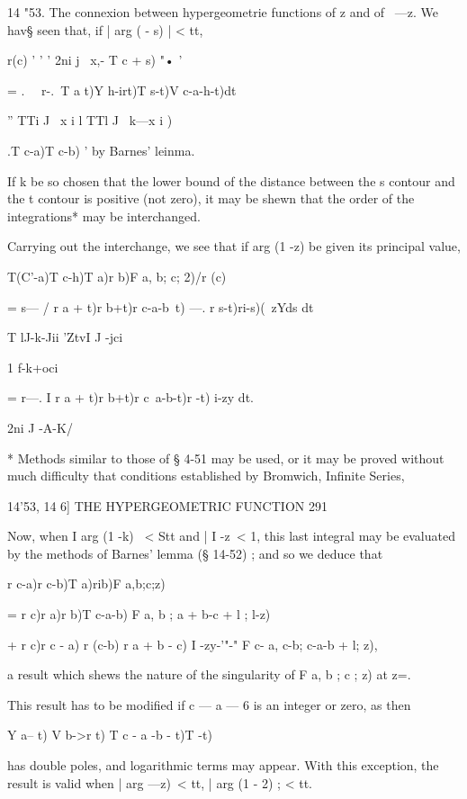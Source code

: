 14 "53. The connexion between hypergeometrie functions of z and of \ —z. 
We hav§ seen that, if | arg ( - s) | < tt, 

r(c)   ' ' '   2ni j \ x,- T c + s) "• ' 

=   . \ \  r-.\ T a t)Y h-irt)T s-t)V c-a-h-t)dt\ 

'' TTi J \ x i l TTl J ~k—x i ) 

.T c-a)T c-b)  ' 
by Barnes' leinma. 

If k be so chosen that the lower bound of the distance between the s contour and the 
t contour is positive (not zero), it may be shewn that the order of the integrations* 
may be interchanged. 

Carrying out the interchange, we see that if arg (1 -z) be given its principal value, 

T(C'-a)T  c-h)T  a)r b)F a, b; c; 2)/r (c) 

= s—  / r a + t)r b+t)r c-a-b~t) —. r s-t)ri-s)(~zYds  dt 

 T lJ-k-Jii  'ZtvI J -jci   

1 f-k+oci 

=  r—. I r  a + t)r  b+t)r  c~a-b-t)r  -t)  i-zy dt. 

2ni J -A-K/ 

* Methods similar to those of § 4-51 may be used, or it may be proved without much difficulty 
that conditions established by Bromwich, Infinite Series, %



14'53, 14 6] THE HYPERGEOMETRIC FUNCTION 291 

Now, when I arg (1 -k) \ < Stt and | I -z\ < 1, this last integral may be evaluated by the 
methods of Barnes' lemma (§ 14-52) ; and so we deduce that 

r c-a)r c-b)T a)rib)F a,b;c;z) 

= r  c)r  a)r  b)T  c-a-b) F  a, b ; a + b-c + l ; l-z) 

+ r  c)r  c - a) r (c-b) r  a + b - c)  I -zy-'"-" F c- a, c-b; c-a-b + l;  z), 

a result which shews the nature of the singularity of F  a, b ; c ; z) at z=.  

This result has to be modified if c — a — 6 is an integer or zero, as then 

Y  a-- t) V  b->r t) T  c - a -b - t)T  -t) 

has double poles, and logarithmic terms may appear. With this exception, the result is 
valid when | arg  —z)\ < tt, | arg (1 - 2) ; < tt. 

